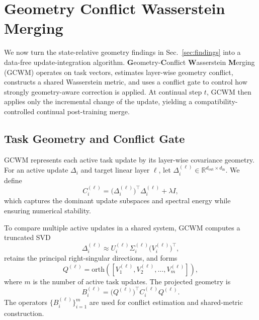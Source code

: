 \documentclass{article}
\begin{document}
\vspace{-0.2em}
\section{Geometry Conflict Wasserstein Merging}
\label{sec:method}

We now turn the state-relative geometry findings in Sec.~\ref{sec:findings} into a data-free update-integration algorithm.
\textbf{G}eometry-\textbf{C}onflict \textbf{W}asserstein \textbf{M}erging (GCWM) operates on task vectors, estimates layer-wise geometry conflict, constructs a shared Wasserstein metric, and uses a conflict gate to control how strongly geometry-aware correction is applied.
At continual step \(t\), GCWM then applies only the incremental change of the update, yielding a compatibility-controlled continual post-training merge.

\vspace{-0.4em}
\subsection{Task Geometry and Conflict Gate}

GCWM represents each active task update by its layer-wise covariance geometry.
For an active update \(\Delta_i\) and target linear layer \(\ell\), let
\(\Delta_i^{(\ell)}\in\mathbb{R}^{d_{\mathrm{out}}\times d_{\mathrm{in}}}\).
We define
{\footnotesize
\begin{equation}
C_i^{(\ell)}
=
\big(\Delta_i^{(\ell)}\big)^\top \Delta_i^{(\ell)}+\lambda I,
\label{eq:covariance-geometry}
\end{equation}
}
which captures the dominant update subspaces and spectral energy while ensuring numerical stability.

To compare multiple active updates in a shared system, GCWM computes a truncated SVD
{\small
\[
\Delta_i^{(\ell)}
\approx
U_i^{(\ell)}\Sigma_i^{(\ell)}\big(V_i^{(\ell)}\big)^\top,
\]
}
retains the principal right-singular directions, and forms
{\small
\begin{equation}
Q^{(\ell)}
=
\mathrm{orth}\!\left(
\left[
V_1^{(\ell)},V_2^{(\ell)},\dots,V_m^{(\ell)}
\right]
\right),
\label{eq:shared-basis}
\end{equation}
}
where \(m\) is the number of active task updates. The projected geometry is
{\small
\begin{equation}
B_i^{(\ell)}
=
\big(Q^{(\ell)}\big)^\top C_i^{(\ell)}Q^{(\ell)} .
\label{eq:projected-geometry}
\end{equation}
}
The operators \(\{B_i^{(\ell)}\}_{i=1}^m\) are used for conflict estimation and shared-metric construction.
\end{document}

